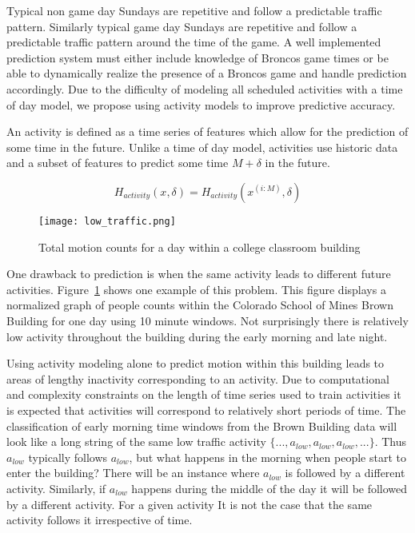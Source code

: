 Typical non game day Sundays are repetitive and follow a predictable traffic pattern.  Similarly typical game day Sundays are repetitive and follow a predictable traffic pattern around the time of the game.  A well implemented prediction system must either include knowledge of Broncos game times or be able to dynamically realize the presence of a Broncos game and handle prediction accordingly.  Due to the difficulty of modeling all scheduled activities with a time of day model, we propose using activity models to improve predictive accuracy.

An activity is defined as a time series of features which allow for the prediction of some time in the future.  Unlike a time of day model, activities use historic data and a subset of features to predict some time $M + \delta$ in the future.

\begin{equation}
\label{eq:activity_predict}
H_{activity}(x, \delta) = H_{activity}(x^{(i:M)}, \delta)
\end{equation}

\begin{figure}[t]
\begin{center}
\texttt{[image: low\_traffic.png]}
\end{center}
\caption{Total motion counts for a day within a college classroom building}
\label{fig:low_traffic}
\end{figure}

One drawback to prediction is when the same activity leads to different future activities.  Figure~\ref{fig:low_traffic} shows one example of this problem.  This figure displays a normalized graph of people counts within the Colorado School of Mines Brown Building for one day using 10 minute windows.  Not surprisingly there is relatively low activity throughout the building during the early morning and late night.

Using activity modeling alone to predict motion within this building leads to areas of lengthy inactivity corresponding to an activity.  Due to computational and complexity constraints on the length of time series used to train activities it is expected that activities will correspond to relatively short periods of time.  The classification of early morning time windows from the Brown Building data will look like a long string of the same low traffic activity $\{..., a_{low}, a_{low}, a_{low}, ...\}$.   Thus $a_{low}$ typically follows $a_{low}$, but what happens in the morning when people start to enter the building?  There will be an instance where $a_{low}$ is followed by a different activity.  Similarly, if $a_{low}$ happens during the middle of the day it will be followed by a different activity.  For a given activity It is not the case that the same activity follows it irrespective of time.  

